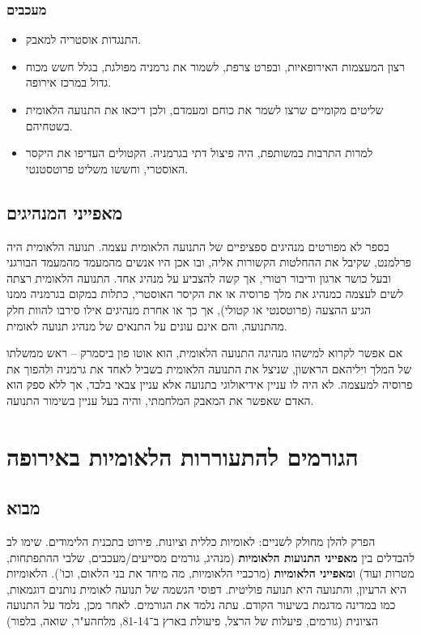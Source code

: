 \documentclass[a4paper]{book}
\begin{document}
	\subsubsection{מעכבים}
	\begin{itemize}
		\item התנגדות אוסטריה למאבק. 
		\item רצון המעצמות האירופאיות, ובפרט צרפת, לשמור את גרמניה מפולגת, בגלל חשש מכוח גדול במרכז אירופה. 
		\item שליטים מקומיים שרצו לשמר את כוחם ומעמדם, ולכן דיכאו את התנועה הלאומית בשטחיהם. 
		\item למרות התרבות במשותפת, היה פיצול דתי בגרמניה. הקטולים העדיפו את היקסר האוסטרי, וחששו משליט פרוטסטנטי. 
	\end{itemize}
	
	\subsection{מאפייני המנהיגים}
	בספר לא מפורטים מנהיגים ספציפיים של התנועה הלאומית עצמה. תנועה הלאומית היה פרלמנט, שקיבל את ההחלטות הקשורות אליה, ובו אכן היו אנשים מהמעמד מהמעמד הבורגני ובעל כושר ארגון ודיבור רטורי, אך קשה להצביע על מנהיג אחד. התנועה הלאומית רצתה לשים לעצמה כמנהיג את מלך פרוסיה או את הקיסר האוסטרי, כתלות במקום בגרמניה ממנו הגיע ההצעה (פרוטסנטי או קטולי), אך כך או אחרת מנהיגים אילו סירבו להוות חלק מהתנועה, והם אינם עונים על התנאים של מנהיג תנועה לאומית.
	
	אם אפשר לקרוא למישהו מנהיגה התנועה הלאומית, הוא אוטו פון ביסמרק – ראש ממשלתו של המלך ויליהאם הראשון, שניצל את התנועה הלאומית בשביל לאחד את גרמניה ולהפוך את פרוסיה למעצמה. לא היה לו עניין אידיאולוגי בתנועה אלא עניין צבאי בלבד, אך ללא ספק הוא האדם שאפשר את המאבק המלחמתי, והיה בעל עניין בשימור התנועה. 
	
	\section{הגורמים להתעוררות הלאומיות באירופה}
	\subsection{מבוא}
	הפרק להלן מחולק לשניים: לאומיות כללית וציונות. פירוט בתכנית הלימודים. שימו לב להבדלים בין \textbf{מאפייני התנועות הלאומיות} (מנהיג, גורמים מסייעים/מעכבים, שלבי ההתפתחות, מטרות ועוד) ו\textbf{מאפייני הלאומיות} (מרכביי הלאומיות, מה מיחד את בני הלאום, וכו'). הלאומיות היא הרעיון, והתנועה היא תנועה פוליטית. דפוסי הגשמה של תנועה לאומית נותנים דוגמאות, כמו במדינה מדגמת בשיעור הקודם. עתה נלמד את הגורמים. לאחר מכן, נלמד על התנועה הציונית (גורמים, פיעלות של הרצל, פיעולת בארץ ב־81-14, מלחהע"ר, שואה, בלפור)
	
\end{document}
